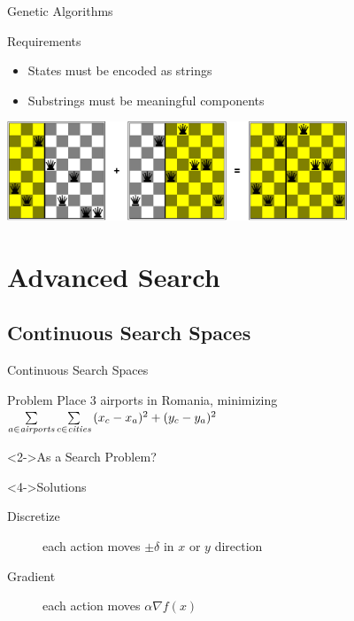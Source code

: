 \documentclass[14pt]{beamer}
\begin{document}
\begin{frame}{Genetic Algorithms}
\begin{block}{Requirements}
\begin{itemize}
\item States must be encoded as strings
\item Substrings must be meaningful components \\
\end{itemize}
\end{block}
\begin{center}
\includegraphics[width=4in]{8-queens-crossover.pdf}
\end{center}
\end{frame}


\section{Advanced Search}


\subsection{Continuous Search Spaces}


\begin{frame}{Continuous Search Spaces}
\begin{block}{Problem}
Place 3 airports in Romania, minimizing
$\sum\limits_{a \in \mbox{\textit{\scriptsize airports}}}
 {\sum\limits_{c \in \mbox{\textit{\scriptsize cities}}}
  {(x_c - x_a)^2 + (y_c - y_a)^2}}$
\end{block}
\begin{block}<2->{As a Search Problem?}
\end{block}
\begin{block}<4->{Solutions}
\begin{description}
\item[Discretize] each action moves $\pm\delta$ in $x$ or $y$ direction
\item[Gradient] each action moves $\alpha\nabla f(x)$
\end{description}
\end{block}
\end{frame}
\end{document}
